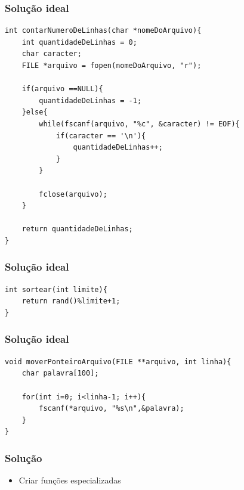 \begin{frame}[fragile]
	\frametitle{Solução ideal}

	\begin{listing}[H]
		\begin{verbatim}
int contarNumeroDeLinhas(char *nomeDoArquivo){
    int quantidadeDeLinhas = 0;
    char caracter;
    FILE *arquivo = fopen(nomeDoArquivo, "r");

    if(arquivo ==NULL){
        quantidadeDeLinhas = -1;
    }else{
        while(fscanf(arquivo, "%c", &caracter) != EOF){
            if(caracter == '\n'){
                quantidadeDeLinhas++;
            }
        }

        fclose(arquivo);
    }

    return quantidadeDeLinhas;
}
		\end{verbatim}
	\end{listing}

\end{frame}

\begin{frame}[fragile]
	\frametitle{Solução ideal}

	\begin{listing}[H]
		\begin{verbatim}
int sortear(int limite){
	return rand()%limite+1;
}
		\end{verbatim}
	\end{listing}

\end{frame}

\begin{frame}[fragile]
	\frametitle{Solução ideal}

	\begin{listing}[H]
		\begin{verbatim}
void moverPonteiroArquivo(FILE **arquivo, int linha){
    char palavra[100];

    for(int i=0; i<linha-1; i++){
        fscanf(*arquivo, "%s\n",&palavra);
    }
}
		\end{verbatim}
	\end{listing}

\end{frame}

\begin{frame}
	\frametitle{Solução}

	\begin{itemize}
		\item Criar funções especializadas
	\end{itemize}
\end{frame}
